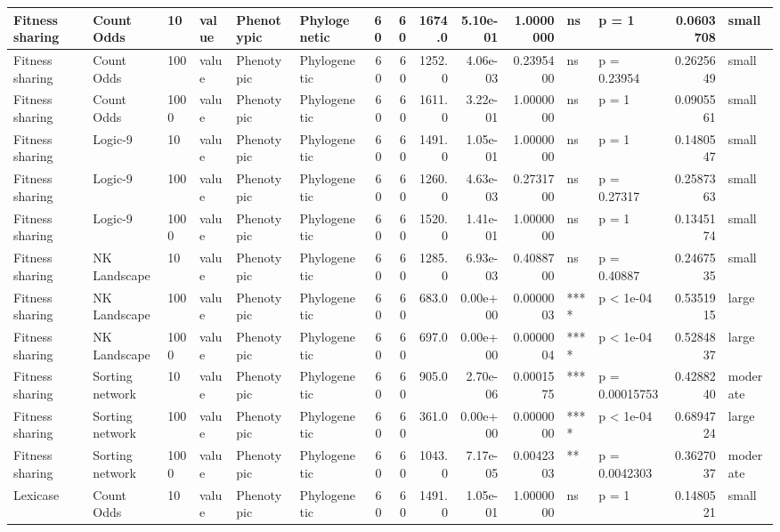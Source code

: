 \documentclass[]{book}
\begin{document}
\begin{table}
\begin{tabular}[t]{l|l|l|l|l|l|r|r|r|r|r|l|l|r|l}
\hline
Fitness sharing & Count Odds & 10 & value & Phenotypic & Phylogenetic & 60 & 60 & 1674.0 & 5.10e-01 & 1.0000000 & ns & p = 1 & 0.0603708 & small\\
\hline
Fitness sharing & Count Odds & 100 & value & Phenotypic & Phylogenetic & 60 & 60 & 1252.0 & 4.06e-03 & 0.2395400 & ns & p = 0.23954 & 0.2625649 & small\\
\hline
Fitness sharing & Count Odds & 1000 & value & Phenotypic & Phylogenetic & 60 & 60 & 1611.0 & 3.22e-01 & 1.0000000 & ns & p = 1 & 0.0905561 & small\\
\hline
Fitness sharing & Logic-9 & 10 & value & Phenotypic & Phylogenetic & 60 & 60 & 1491.0 & 1.05e-01 & 1.0000000 & ns & p = 1 & 0.1480547 & small\\
\hline
Fitness sharing & Logic-9 & 100 & value & Phenotypic & Phylogenetic & 60 & 60 & 1260.0 & 4.63e-03 & 0.2731700 & ns & p = 0.27317 & 0.2587363 & small\\
\hline
Fitness sharing & Logic-9 & 1000 & value & Phenotypic & Phylogenetic & 60 & 60 & 1520.0 & 1.41e-01 & 1.0000000 & ns & p = 1 & 0.1345174 & small\\
\hline
Fitness sharing & NK Landscape & 10 & value & Phenotypic & Phylogenetic & 60 & 60 & 1285.0 & 6.93e-03 & 0.4088700 & ns & p = 0.40887 & 0.2467535 & small\\
\hline
Fitness sharing & NK Landscape & 100 & value & Phenotypic & Phylogenetic & 60 & 60 & 683.0 & 0.00e+00 & 0.0000003 & **** & p < 1e-04 & 0.5351915 & large\\
\hline
Fitness sharing & NK Landscape & 1000 & value & Phenotypic & Phylogenetic & 60 & 60 & 697.0 & 0.00e+00 & 0.0000004 & **** & p < 1e-04 & 0.5284837 & large\\
\hline
Fitness sharing & Sorting network & 10 & value & Phenotypic & Phylogenetic & 60 & 60 & 905.0 & 2.70e-06 & 0.0001575 & *** & p = 0.00015753 & 0.4288240 & moderate\\
\hline
Fitness sharing & Sorting network & 100 & value & Phenotypic & Phylogenetic & 60 & 60 & 361.0 & 0.00e+00 & 0.0000000 & **** & p < 1e-04 & 0.6894724 & large\\
\hline
Fitness sharing & Sorting network & 1000 & value & Phenotypic & Phylogenetic & 60 & 60 & 1043.0 & 7.17e-05 & 0.0042303 & ** & p = 0.0042303 & 0.3627037 & moderate\\
\hline
Lexicase & Count Odds & 10 & value & Phenotypic & Phylogenetic & 60 & 60 & 1491.0 & 1.05e-01 & 1.0000000 & ns & p = 1 & 0.1480521 & small\\
\hline

\end{tabular}
\end{table}
\end{document}
